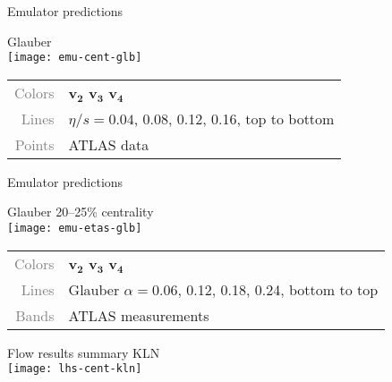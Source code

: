 \documentclass{beamer}
\begin{document}
\begin{frame}{Emulator predictions}
  \begin{center}
    \hspace{1ex} Glauber \\[1ex]
    \texttt{[image: emu-cent-glb]} \\
  \end{center}

  \small
  \begin{tabular}{rl}
    \textcolor{grey}{Colors} &
    \textcolor{vnbl}{$\boldsymbol{v_2}$}
    \textcolor{vngr}{$\boldsymbol{v_3}$}
    \textcolor{vnor}{$\boldsymbol{v_4}$} \\
    \textcolor{grey}{Lines} & $\eta/s = 0.04$, 0.08, 0.12, 0.16, top to bottom \\
    \textcolor{grey}{Points} & ATLAS data
  \end{tabular}
\end{frame}



\begin{frame}{Emulator predictions}
  \begin{center}
    \hspace{1ex} Glauber 20--25\% centrality \\[1ex]
    \texttt{[image: emu-etas-glb]} \\
  \end{center}

  \small
  \begin{tabular}{rl}
    \textcolor{grey}{Colors} &
    \textcolor{vnbl}{$\boldsymbol{v_2}$}
    \textcolor{vngr}{$\boldsymbol{v_3}$}
    \textcolor{vnor}{$\boldsymbol{v_4}$} \\
    \textcolor{grey}{Lines} & Glauber $\alpha = 0.06$, 0.12, 0.18, 0.24, bottom to top \\
    \textcolor{grey}{Bands} & ATLAS measurements
  \end{tabular}
\end{frame}



\begin{frame}{Flow results summary}
  \vspace{2ex}
  \centering
  \hspace{3ex} KLN \\[1ex]
  \texttt{[image: lhs-cent-kln]}
\end{frame}
\end{document}
